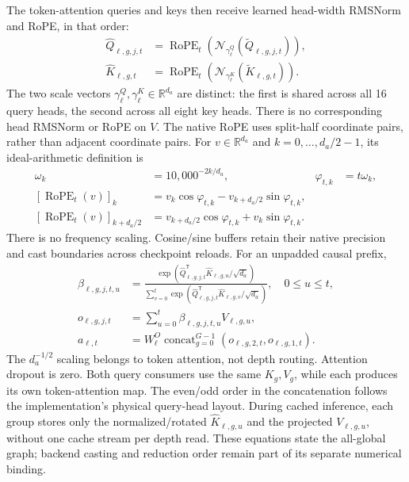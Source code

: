 \documentclass[11pt,letterpaper]{article}
\begin{document}
The token-attention queries and keys then receive learned head-width RMSNorm
and RoPE, in that order:
\begin{align}
 \widehat Q_{\ell,g,j,t}
   &=\operatorname{RoPE}_t\!\left(
     \mathcal{N}_{\gamma^Q_\ell}(\widetilde Q_{\ell,g,j,t})\right),\\
 \widehat K_{\ell,g,t}
   &=\operatorname{RoPE}_t\!\left(
     \mathcal{N}_{\gamma^K_\ell}(\widetilde K_{\ell,g,t})\right).
 \label{eq:qk-norm-rope}
\end{align}
The two scale vectors $\gamma^Q_\ell,\gamma^K_\ell\in\mathbb{R}^{d_a}$ are
distinct: the first is shared across all 16 query heads, the second across
all eight key heads. There is no corresponding head RMSNorm or RoPE on $V$.
The native RoPE uses split-half coordinate pairs, rather than adjacent
coordinate pairs. For $v\in\mathbb R^{d_a}$ and $k=0,\ldots,d_a/2-1$,
its ideal-arithmetic definition is
\begin{align}
 \omega_k&=10{,}000^{-2k/d_a}, &\varphi_{t,k}&=t\omega_k,\\
 [\operatorname{RoPE}_t(v)]_k
   &=v_k\cos\varphi_{t,k}-v_{k+d_a/2}\sin\varphi_{t,k},\\
 [\operatorname{RoPE}_t(v)]_{k+d_a/2}
   &=v_{k+d_a/2}\cos\varphi_{t,k}+v_k\sin\varphi_{t,k}.
 \label{eq:rope}
\end{align}
There is no frequency scaling. Cosine/sine buffers retain their native
precision and cast boundaries across checkpoint reloads.
For an unpadded causal prefix,
\begin{align}
 \beta_{\ell,g,j,t,u}
   &=\frac{\exp\!\left(
      \widehat Q_{\ell,g,j,t}^{\mathsf T}\widehat K_{\ell,g,u}/\sqrt{d_a}\right)}
     {\sum_{v=0}^{t}\exp\!\left(
      \widehat Q_{\ell,g,j,t}^{\mathsf T}\widehat K_{\ell,g,v}/\sqrt{d_a}\right)},
      \quad 0\leq u\leq t,\\
 o_{\ell,g,j,t}&=\sum_{u=0}^{t}\beta_{\ell,g,j,t,u}V_{\ell,g,u},\\
 a_{\ell,t}&=W^O_\ell\operatorname{concat}_{g=0}^{G-1}
       (o_{\ell,g,2,t},o_{\ell,g,1,t}).
 \label{eq:token-attention}
\end{align}
The $d_a^{-1/2}$ scaling belongs to token attention, not depth routing.
Attention dropout is zero. Both query consumers use the same $K_g,V_g$, while
each produces its own token-attention map. The even/odd order in the
concatenation follows the implementation's physical query-head layout.
During cached inference, each group stores only the normalized/rotated
$\widehat K_{\ell,g,u}$ and the projected $V_{\ell,g,u}$, without one cache
stream per depth read. These equations state the all-global graph; backend
casting and reduction order remain part of its separate numerical binding.
\end{document}
